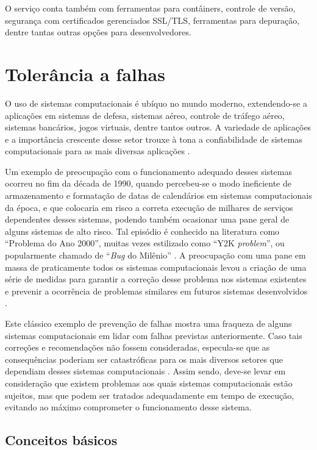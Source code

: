 \documentclass[
	12pt,				%
	oneside,			%
	a4paper,			%
	chapter=TITLE,		%
	english,			%
	french,				%
	spanish,			%
	brazil				%
	]{abntex2}
\begin{document}
O serviço conta também com ferramentas para contâiners, controle de versão, segurança com certificados gerenciados SSL/TLS, ferramentas para depuração, dentre tantas outras opções para desenvolvedores.

\section{Tolerância a falhas}

O uso de sistemas computacionais é ubíquo no mundo moderno, extendendo-se a aplicações em sistemas de defesa, sistemas aéreo, controle de tráfego aéreo, sistemas bancários, jogos virtuais, dentre tantos outros. A variedade de aplicações e a importância crescente desse setor trouxe à tona a confiabilidade de sistemas computacionais para as mais diversas aplicações \cite{andersonfault}.

Um exemplo de preocupação com o funcionamento adequado desses sistemas ocorreu no fim da década de 1990, quando percebeu-se o modo ineficiente de armazenamento e formatação de datas de calendários em sistemas computacionais da época, e que colocaria em risco a correta execução de milhares de serviços dependentes desses sistemas, podendo também ocasionar uma pane geral de alguns sistemas de alto risco. Tal episódio é conhecido na literatura como ``Problema do Ano 2000'', muitas vezes estilizado como ``Y2K \emph{problem}'', ou popularmente chamado de ``\emph{Bug} do Milênio'' . A preocupação com uma pane em massa de praticamente todos os sistemas computacionais levou a criação de uma série de medidas para garantir a correção desse problema nos sistemas existentes e prevenir a ocorrência de problemas similares em futuros sistemas desenvolvidos \cite{petersen1998y2k}.

Este clássico exemplo de prevenção de falhas mostra uma fraqueza de alguns sistemas computacionais em lidar com falhas previstas anteriormente. Caso tais correções e recomendações não fossem consideradas, especula-se que as consequências poderiam ser catastróficas para os mais diversos setores que dependiam desses sistemas computacionais \cite{smith1997year}. Assim sendo, deve-se levar em consideração que existem problemas aos quais sistemas computacionais estão sujeitos, mas que podem ser tratados adequadamente em tempo de execução, evitando ao máximo comprometer o funcionamento desse sistema.

\subsection{Conceitos básicos}
\end{document}
